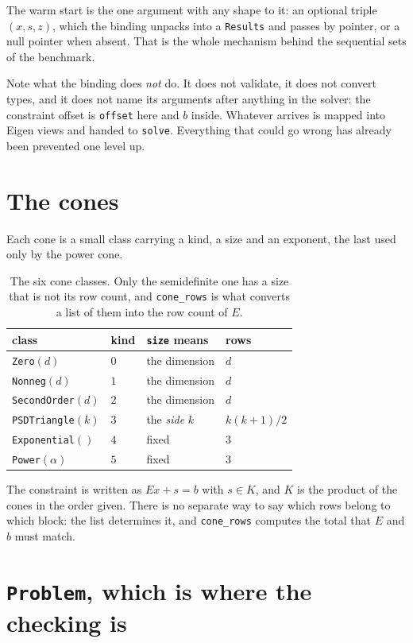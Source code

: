 \documentclass[a4paper,11pt]{book}
\theoremstyle{plain}
\theoremstyle{definition}
\theoremstyle{remark}
\numberwithin{equation}{chapter}
\numberwithin{algorithm}{chapter}
\begin{document}
	The warm start is the one argument with any shape to it: an optional triple
	$(x,s,z)$, which the binding unpacks into a \texttt{Results} and passes by
	pointer, or a null pointer when absent. That is the whole mechanism behind the
	sequential sets of the benchmark.

	Note what the binding does \emph{not} do. It does not validate, it does not
	convert types, and it does not name its arguments after anything in the
	solver: the constraint offset is \texttt{offset} here and $b$ inside. Whatever
	arrives is mapped into Eigen views and handed to \texttt{solve}. Everything
	that could go wrong has already been prevented one level up.

	\section{The cones}

	Each cone is a small class carrying a kind, a size and an exponent, the last
	used only by the power cone.

	\begin{table}[H]
		\centering\small
		\begin{tabular}{llll}
			\toprule
			class & kind & \texttt{size} means & rows\\
			\midrule
			\texttt{Zero}$(d)$ & $0$ & the dimension & $d$\\
			\texttt{Nonneg}$(d)$ & $1$ & the dimension & $d$\\
			\texttt{SecondOrder}$(d)$ & $2$ & the dimension & $d$\\
			\texttt{PSDTriangle}$(k)$ & $3$ & the \emph{side} $k$ & $k(k+1)/2$\\
			\texttt{Exponential}$()$ & $4$ & fixed & $3$\\
			\texttt{Power}$(\alpha)$ & $5$ & fixed & $3$\\
			\bottomrule
		\end{tabular}
		\caption{The six cone classes. Only the semidefinite one has a size that is
			not its row count, and \texttt{cone\_rows} is what converts a list of them
			into the row count of $E$.}
	\end{table}

	The constraint is written as $Ex+s=b$ with $s\in K$, and $K$ is the product of
	the cones in the order given. There is no separate way to say which rows
	belong to which block: the list determines it, and \texttt{cone\_rows}
	computes the total that $E$ and $b$ must match.

	\section{\texttt{Problem}, which is where the checking is}
\end{document}
